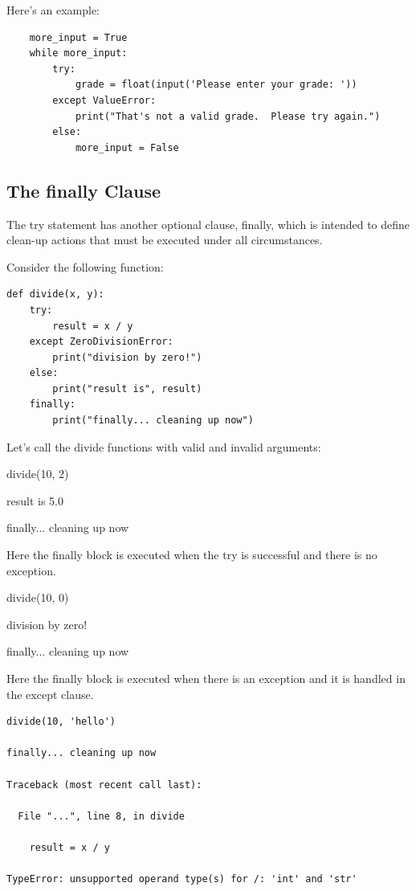 \documentclass{article}
\begin{document}
Here's an example:

\begin{lstlisting}
    more_input = True
    while more_input:
        try:
            grade = float(input('Please enter your grade: '))
        except ValueError:
            print("That's not a valid grade.  Please try again.")
        else:
            more_input = False
\end{lstlisting}

\subsection{The finally Clause}

The try statement has another optional clause, finally, which is intended to define clean-up actions that must be executed under all circumstances.

Consider the following function:

\begin{lstlisting}
def divide(x, y):
    try:
        result = x / y
    except ZeroDivisionError:
        print("division by zero!")
    else:
        print("result is", result)
    finally:
        print("finally... cleaning up now")
\end{lstlisting}

Let's call the divide functions with valid and invalid arguments:

divide(10, 2)

result is 5.0

finally... cleaning up now

Here the finally block is executed when the try is successful and there is no exception.

divide(10, 0)

division by zero!

finally... cleaning up now 

Here the finally block is executed when there is an exception and it is handled in the except clause.

\begin{lstlisting}
divide(10, 'hello')

finally... cleaning up now

Traceback (most recent call last):

  File "...", line 8, in divide

    result = x / y

TypeError: unsupported operand type(s) for /: 'int' and 'str'
\end{lstlisting}
\end{document}
